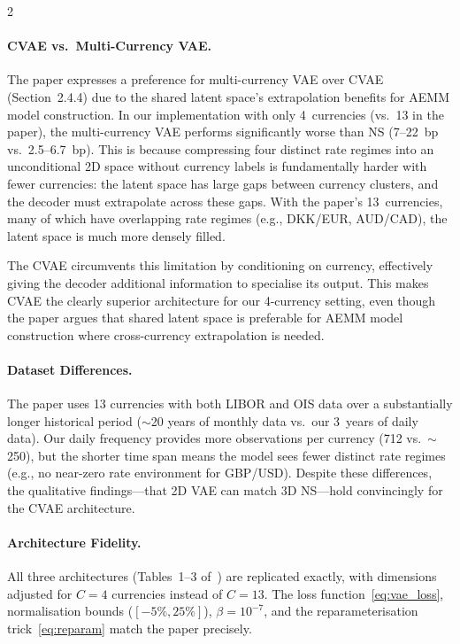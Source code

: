 \documentclass[10pt,a4paper]{article}
\theoremstyle{plain}
\theoremstyle{definition}
\begin{document}
\begin{multicols}{2}
\paragraph{CVAE vs.\ Multi-Currency VAE.} The paper expresses a preference for multi-currency VAE over CVAE (Section~2.4.4) due to the shared latent space's extrapolation benefits for AEMM model construction. In our implementation with only 4~currencies (vs.\ 13 in the paper), the multi-currency VAE performs significantly worse than NS (7--22~bp vs.\ 2.5--6.7~bp). This is because compressing four distinct rate regimes into an unconditional 2D space without currency labels is fundamentally harder with fewer currencies: the latent space has large gaps between currency clusters, and the decoder must extrapolate across these gaps. With the paper's 13~currencies, many of which have overlapping rate regimes (e.g., DKK/EUR, AUD/CAD), the latent space is much more densely filled.

The CVAE circumvents this limitation by conditioning on currency, effectively giving the decoder additional information to specialise its output. This makes CVAE the clearly superior architecture for our 4-currency setting, even though the paper argues that shared latent space is preferable for AEMM model construction where cross-currency extrapolation is needed.

\paragraph{Dataset Differences.} The paper uses 13 currencies with both LIBOR and OIS data over a substantially longer historical period ($\sim$20 years of monthly data vs.\ our 3~years of daily data). Our daily frequency provides more observations per currency (712 vs.\ $\sim$250), but the shorter time span means the model sees fewer distinct rate regimes (e.g., no near-zero rate environment for GBP/USD). Despite these differences, the qualitative findings---that 2D VAE can match 3D NS---hold convincingly for the CVAE architecture.

\paragraph{Architecture Fidelity.} All three architectures (Tables~1--3 of~\cite{sokol2022}) are replicated exactly, with dimensions adjusted for $C=4$ currencies instead of $C=13$. The loss function~\cref{eq:vae_loss}, normalisation bounds ($[-5\%, 25\%]$), $\beta = 10^{-7}$, and the reparameterisation trick~\cref{eq:reparam} match the paper precisely.


\end{multicols}
\end{document}
